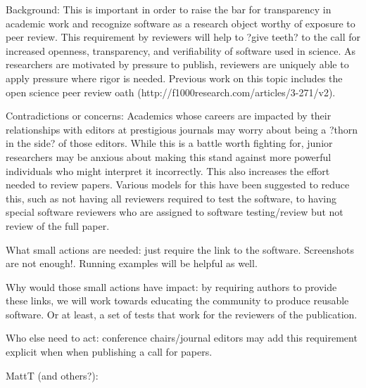 \documentclass[a4paper,UKenglish]{dagman}
\begin{document}
Background: This is important in order to raise the bar for transparency in academic work and recognize software as a research object worthy of exposure to peer review. This requirement by reviewers will help to ?give teeth? to the call for increased openness, transparency, and verifiability of software used in science. As researchers are motivated by pressure to publish, reviewers are uniquely able to apply pressure where rigor is needed. Previous work on this topic includes the open science peer review oath (http://f1000research.com/articles/3-271/v2). 

Contradictions or concerns: Academics whose careers are impacted by their relationships with editors at prestigious journals may worry about being a ?thorn in the side? of those editors. While this is a battle worth fighting for, junior researchers may be anxious about making this stand against more powerful individuals who might interpret it incorrectly. 
This also increases the effort needed to review papers.  Various models for this have been suggested to reduce this, such as not having all reviewers required to test the software, to having special software reviewers who are assigned to software testing/review but not review of the full paper.

What small actions are needed: just require the link to the software. Screenshots are not enough!. Running examples will be helpful as well.

Why would those small actions have impact: by requiring authors to provide these links, we will work towards educating the community to produce reusable software. Or at least, a set of tests that work for the reviewers of the publication. 

Who else need to act: conference chairs/journal editors may add this requirement explicit when when publishing a call for papers. 

MattT (and others?):

\end{document}
